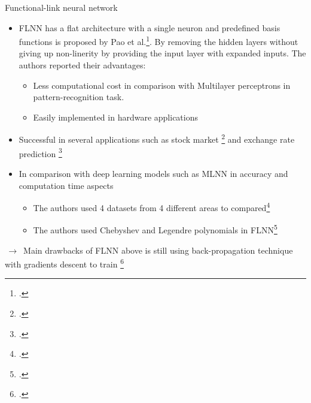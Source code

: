 \documentclass{beamer}
\begin{document}
\begin{frame}{Functional-link neural network}
	\begin{itemize}
		\item{
			 \small FLNN has a flat architecture with a single neuron and predefined basis functions is proposed by Pao et al.\footcite{Yoh-Han Pao 1989}. By removing the hidden layers without giving up non-linerity by providing the input layer with expanded inputs. The authors reported their advantages: 
			\begin{itemize}
				\item {
					\small Less computational cost in comparison with Multilayer perceptrons in pattern-recognition task.
				}
				\item {
					\small Easily implemented in hardware applications
				}
			\end{itemize}
		}
		\item{
			\small  Successful in several applications such as stock market \footcite{Majhi et al. 2009} and exchange rate prediction \footcite{Majhi et al. 2012}
		}
		\item{
			\small  In comparison with deep learning models such as MLNN in accuracy and computation time aspects
			\begin{itemize}
				\item {
					\small The authors used 4 datasets from 4 different areas to compared\footcite{Khandelwal et al. 2015}
				}
				\item {
					\small The authors used Chebyshev and Legendre polynomials in FLNN\footcite{Sahoo et al. 2018}
				}
			\end{itemize}
		}		
	\end{itemize}
	
	$\,\to\,$ Main drawbacks of FLNN above is still using back-propagation technique with gradients descent to train \footcite{Dehuri, Satchidananda, and Sung-Bae Cho 2010}
\end{frame}
\end{document}
